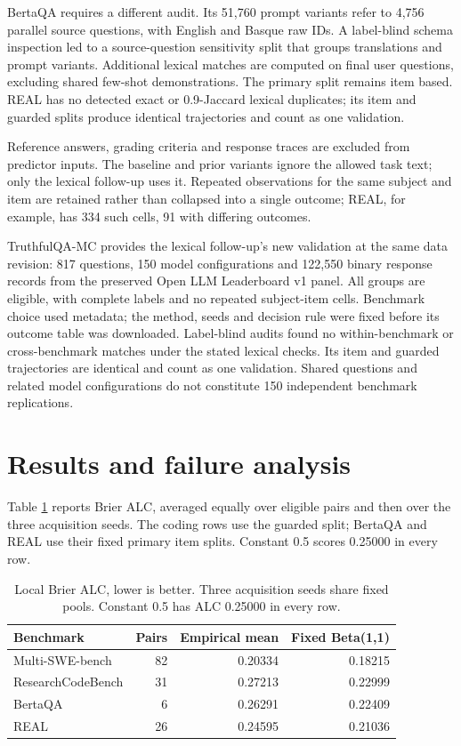 \documentclass{article}
\begin{document}
BertaQA requires a different audit. Its 51,760 prompt variants refer to 4,756 parallel source questions, with English and Basque raw IDs. A label-blind schema inspection led to a source-question sensitivity split that groups translations and prompt variants. Additional lexical matches are computed on final user questions, excluding shared few-shot demonstrations. The primary split remains item based. REAL has no detected exact or 0.9-Jaccard lexical duplicates; its item and guarded splits produce identical trajectories and count as one validation.

Reference answers, grading criteria and response traces are excluded from predictor inputs. The baseline and prior variants ignore the allowed task text; only the lexical follow-up uses it. Repeated observations for the same subject and item are retained rather than collapsed into a single outcome; REAL, for example, has 334 such cells, 91 with differing outcomes.

TruthfulQA-MC \cite{ref10} provides the lexical follow-up's new validation at the same data revision: 817 questions, 150 model configurations and 122,550 binary response records from the preserved Open LLM Leaderboard v1 panel. All groups are eligible, with complete labels and no repeated subject-item cells. Benchmark choice used metadata; the method, seeds and decision rule were fixed before its outcome table was downloaded. Label-blind audits found no within-benchmark or cross-benchmark matches under the stated lexical checks. Its item and guarded trajectories are identical and count as one validation. Shared questions and related model configurations do not constitute 150 independent benchmark replications.

\section{Results and failure analysis}\label{results-and-failure-analysis}

Table \ref{tab:results} reports Brier ALC, averaged equally over eligible pairs and then over the three acquisition seeds. The coding rows use the guarded split; BertaQA and REAL use their fixed primary item splits. Constant 0.5 scores 0.25000 in every row.

\begin{table}[ht]
\centering
\caption{Local Brier ALC, lower is better. Three acquisition seeds share fixed pools. Constant 0.5 has ALC 0.25000 in every row.}
\label{tab:results}
\begin{tabular}{lrrr}
\toprule
Benchmark & Pairs & Empirical mean & Fixed Beta(1,1) \\
\midrule
Multi-SWE-bench & 82 & 0.20334 & 0.18215 \\
ResearchCodeBench & 31 & 0.27213 & 0.22999 \\
BertaQA & 6 & 0.26291 & 0.22409 \\
REAL & 26 & 0.24595 & 0.21036 \\
\bottomrule
\end{tabular}
\end{table}
\end{document}
